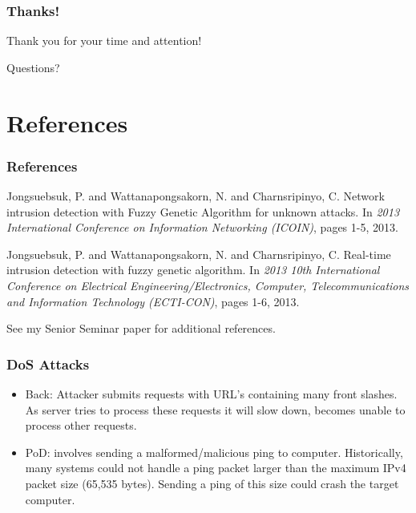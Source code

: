 \documentclass{beamer}
\newcommand{\linespace}{\vskip 0.25cm}
\begin{document}
\begin{frame}
	\frametitle{Thanks!}
	
	Thank you for your time and attention!
		
	\linespace
	\linespace
	
	\begin{center}
	{\Large Questions?}
	\end{center}
\end{frame}


\section*{References}

\begin{frame} 
	\frametitle{References} 
	
	\begin{thebibliography}{lskdjf}
	
	\begin{small}
Jongsuebsuk, P. and Wattanapongsakorn, N. and Charnsripinyo, C.
\newblock Network intrusion detection with Fuzzy Genetic Algorithm for unknown attacks.
\newblock In \emph{2013 International Conference on Information Networking (ICOIN)}, pages 1-5, 2013.
	
	
Jongsuebsuk, P. and Wattanapongsakorn, N. and Charnsripinyo, C.
\newblock Real-time intrusion detection with fuzzy genetic algorithm.
\newblock In \emph{2013 10th International Conference on Electrical Engineering/Electronics, Computer, Telecommunications and Information Technology (ECTI-CON)}, pages 1-6, 2013.
	\end{small}
	
  	\end{thebibliography}
  	
  	\linespace
  	
  	\begin{center}
  	\begin{small}
  	See my Senior Seminar paper for additional references.
  	\end{small}
  	\end{center}
	
\end{frame} 


\begin{frame}
	\frametitle{DoS Attacks}
	\begin{itemize}
		\item Back: Attacker submits requests with URL's containing many front slashes. As server tries to process these requests it will slow down, becomes unable to process other requests.
		\linespace
		\linespace
		\item PoD: involves sending a malformed/malicious ping to computer. Historically, many systems could not handle a ping packet larger than the maximum IPv4 packet size (65,535 bytes). Sending a ping of this size could crash the target computer.
	\end{itemize}
\end{frame}
\end{document}
